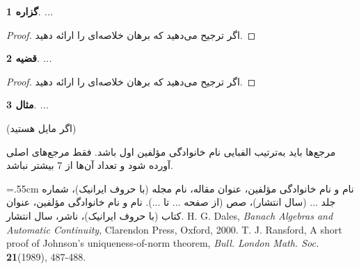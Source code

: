 \documentclass[a0,12pt,portrait]{a0poster}
\newtheorem{theorem}{قضیه}[section]
\newtheorem{proposition}[theorem]{گزاره}
\newtheorem{example}[theorem]{مثال}
\numberwithin{equation}{section}
\begin{document}
\begin{multicols}{2}
\begin{proposition}
...
\end{proposition}
\begin{proof}
اگر ترجیح می‌دهید که برهان خلاصه‌ای را ارائه دهید.  
\end{proof}
\begin{theorem}
...
\end{theorem}
\begin{proof}
اگر ترجیح می‌دهید که برهان خلاصه‌ای را ارائه دهید. 
\end{proof}
\begin{example}
...
\end{example}
  (اگر مایل هستید)

\noindent مرجع‌ها باید به‌ترتیب الفبایی نام خانوادگی مؤلفین اول باشد. فقط مرجع‌های اصلی آورده شود و تعداد آن‌ها از 7 بیشتر نباشد.


\begin{thebibliography}{99}
\baselineskip=.55cm
\persian
{}
 نام و نام خانوادگی مؤلفین، عنوان مقاله، نام مجله (با حروف ایرانیک)، شماره جلد ... (سال انتشار)، صص (از صفحه ... تا ...).
نام و نام خانوادگی مؤلفین، عنوان کتاب (با حروف ایرانیک)، ناشر، سال انتشار.
\latin
{} H. G. Dales, \textit{Banach Algebras and Automatic Continuity}, Clarendon Press, Oxford, 2000.
 T. J. Ransford, A short proof of Johnson's uniqueness-of-norm theorem, \textit{ Bull. London Math. Soc.} {\bf 21}(1989), 487-488.
\end{thebibliography}
\end{multicols}
\end{document}

